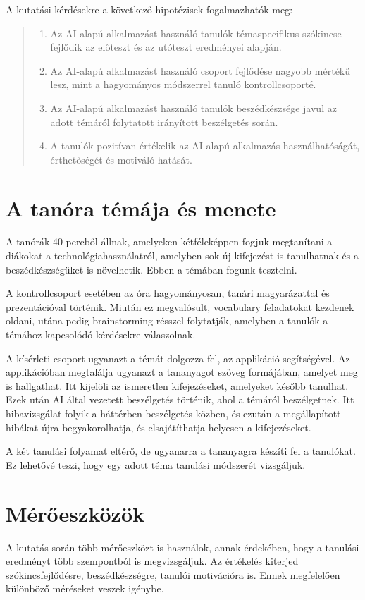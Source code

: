 A kutatási kérdésekre a következő hipotézisek fogalmazhatók meg:
\begin{quote}
\begin{enumerate}
    \item Az AI-alapú alkalmazást használó tanulók témaspecifikus szókincse fejlődik az előteszt és az utóteszt eredményei alapján.
    \item Az AI-alapú alkalmazást használó csoport fejlődése nagyobb mértékű lesz, mint a hagyományos módszerrel tanuló kontrollcsoporté.
    
    \item Az AI-alapú alkalmazást használó tanulók beszédkészsége javul az adott témáról folytatott irányított beszélgetés során.
    
    \item A tanulók pozitívan értékelik az AI-alapú alkalmazás használhatóságát, érthetőségét és motiváló hatását.
\end{enumerate}
\end{quote}

\section{A tanóra témája és menete}
A tanórák 40 percből állnak, amelyeken kétféleképpen fogjuk megtanítani a diákokat a technológiahasználatról, amelyben sok új kifejezést is tanulhatnak és a beszédkészségüket is növelhetik. Ebben a témában fogunk tesztelni.

A kontrollcsoport esetében az óra hagyományosan, tanári magyarázattal és prezentációval történik. Miután ez megvalósult, vocabulary feladatokat kezdenek oldani, utána pedig brainstorming résszel folytatják, amelyben a tanulók a témához kapcsolódó kérdésekre válaszolnak.

A kísérleti csoport ugyanazt a témát dolgozza fel, az applikáció segítségével. Az applikációban megtalálja ugyanazt a tananyagot szöveg formájában, amelyet meg is hallgathat. Itt kijelöli az ismeretlen kifejezéseket, amelyeket később tanulhat. Ezek után AI által vezetett beszélgetés történik, ahol a témáról beszélgetnek. Itt hibavizsgálat folyik a háttérben beszélgetés közben, és ezután a megállapított hibákat újra begyakorolhatja, és elsajátíthatja helyesen a kifejezéseket.

A két tanulási folyamat eltérő, de ugyanarra a tananyagra készíti fel a tanulókat. Ez lehetővé teszi, hogy egy adott téma tanulási módszerét vizsgáljuk.

\section{Mérőeszközök}
A kutatás során több mérőeszközt is használok, annak érdekében, hogy a tanulási eredményt több szempontból is megvizsgáljuk. Az értékelés kiterjed szókincsfejlődésre, beszédkészségre, tanulói motivációra is. Ennek megfelelően különböző méréseket veszek igénybe.

